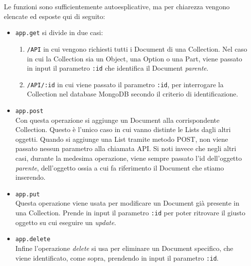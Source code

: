 Le funzioni sono sufficientemente autoesplicative, ma per chiarezza vengono elencate ed esposte qui di seguito:
\begin{itemize}
	\item \texttt{app.get} si divide in due casi:
	\begin{enumerate}
		\item \texttt{/API} in cui vengono richiesti tutti i Document di una Collection. Nel caso in cui la Collection sia un Object, una Option o una Part, viene passato in input il parametro \texttt{:id} che identifica il Document \emph{parente}.
		\item \texttt{/API/:id} in cui viene passato il parametro \texttt{:id}, per interrogare la Collection nel database MongoDB secondo il criterio di identificazione.
	\end{enumerate}
	\item \texttt{app.post} \\Con questa operazione si aggiunge un Document alla corrispondente Collection. Questo è l'unico caso in cui vanno distinte le Lists dagli altri oggetti. Quando si aggiunge una List tramite metodo POST, non viene passato nessun parametro alla chiamata API. Si noti invece che negli altri casi, durante la medesima operazione, viene sempre passato l'id dell'oggetto \emph{parente}, dell'oggetto ossia a cui fa riferimento il Document che stiamo inserendo.
	\item \texttt{app.put} \\Questa operazione viene usata per modificare un Document già presente in una Collection. Prende in input il parametro \texttt{:id} per poter ritrovare il giusto oggetto su cui eseguire un \emph{update}.
	\item \texttt{app.delete} \\Infine l'operazione \emph{delete} si usa per eliminare un Document specifico, che viene identificato, come sopra, prendendo in input il parametro \texttt{:id}. 
\end{itemize}

